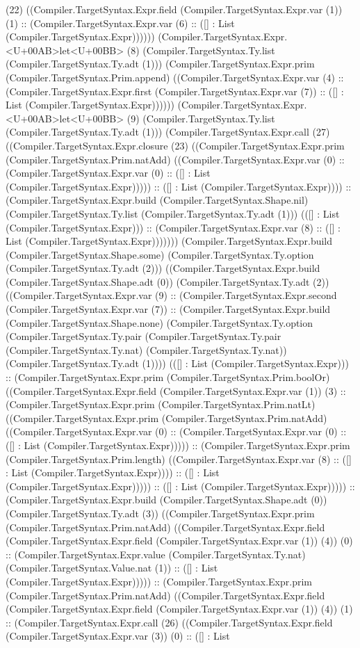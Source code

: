 \documentclass[11pt]{article}
\begin{document}
(22) ((Compiler.TargetSyntax.Expr.field (Compiler.TargetSyntax.Expr.var (1)) (1) :: (Compiler.TargetSyntax.Expr.var (6) :: ([] : List (Compiler.TargetSyntax.Expr)))))) (Compiler.TargetSyntax.Expr.<U+00AB>let<U+00BB> (8) (Compiler.TargetSyntax.Ty.list (Compiler.TargetSyntax.Ty.adt (1))) (Compiler.TargetSyntax.Expr.prim (Compiler.TargetSyntax.Prim.append) ((Compiler.TargetSyntax.Expr.var (4) :: (Compiler.TargetSyntax.Expr.first (Compiler.TargetSyntax.Expr.var (7)) :: ([] : List (Compiler.TargetSyntax.Expr)))))) (Compiler.TargetSyntax.Expr.<U+00AB>let<U+00BB> (9) (Compiler.TargetSyntax.Ty.list (Compiler.TargetSyntax.Ty.adt (1))) (Compiler.TargetSyntax.Expr.call (27) ((Compiler.TargetSyntax.Expr.closure (23) ((Compiler.TargetSyntax.Expr.prim (Compiler.TargetSyntax.Prim.natAdd) ((Compiler.TargetSyntax.Expr.var (0) :: (Compiler.TargetSyntax.Expr.var (0) :: ([] : List (Compiler.TargetSyntax.Expr))))) :: ([] : List (Compiler.TargetSyntax.Expr)))) :: (Compiler.TargetSyntax.Expr.build (Compiler.TargetSyntax.Shape.nil) (Compiler.TargetSyntax.Ty.list (Compiler.TargetSyntax.Ty.adt (1))) (([] : List (Compiler.TargetSyntax.Expr))) :: (Compiler.TargetSyntax.Expr.var (8) :: ([] : List (Compiler.TargetSyntax.Expr))))))) (Compiler.TargetSyntax.Expr.build (Compiler.TargetSyntax.Shape.some) (Compiler.TargetSyntax.Ty.option (Compiler.TargetSyntax.Ty.adt (2))) ((Compiler.TargetSyntax.Expr.build (Compiler.TargetSyntax.Shape.adt (0)) (Compiler.TargetSyntax.Ty.adt (2)) ((Compiler.TargetSyntax.Expr.var (9) :: (Compiler.TargetSyntax.Expr.second (Compiler.TargetSyntax.Expr.var (7)) :: (Compiler.TargetSyntax.Expr.build (Compiler.TargetSyntax.Shape.none) (Compiler.TargetSyntax.Ty.option (Compiler.TargetSyntax.Ty.pair (Compiler.TargetSyntax.Ty.pair (Compiler.TargetSyntax.Ty.nat) (Compiler.TargetSyntax.Ty.nat)) (Compiler.TargetSyntax.Ty.adt (1)))) (([] : List (Compiler.TargetSyntax.Expr))) :: (Compiler.TargetSyntax.Expr.prim (Compiler.TargetSyntax.Prim.boolOr) ((Compiler.TargetSyntax.Expr.field (Compiler.TargetSyntax.Expr.var (1)) (3) :: (Compiler.TargetSyntax.Expr.prim (Compiler.TargetSyntax.Prim.natLt) ((Compiler.TargetSyntax.Expr.prim (Compiler.TargetSyntax.Prim.natAdd) ((Compiler.TargetSyntax.Expr.var (0) :: (Compiler.TargetSyntax.Expr.var (0) :: ([] : List (Compiler.TargetSyntax.Expr))))) :: (Compiler.TargetSyntax.Expr.prim (Compiler.TargetSyntax.Prim.length) ((Compiler.TargetSyntax.Expr.var (8) :: ([] : List (Compiler.TargetSyntax.Expr)))) :: ([] : List (Compiler.TargetSyntax.Expr))))) :: ([] : List (Compiler.TargetSyntax.Expr))))) :: (Compiler.TargetSyntax.Expr.build (Compiler.TargetSyntax.Shape.adt (0)) (Compiler.TargetSyntax.Ty.adt (3)) ((Compiler.TargetSyntax.Expr.prim (Compiler.TargetSyntax.Prim.natAdd) ((Compiler.TargetSyntax.Expr.field (Compiler.TargetSyntax.Expr.field (Compiler.TargetSyntax.Expr.var (1)) (4)) (0) :: (Compiler.TargetSyntax.Expr.value (Compiler.TargetSyntax.Ty.nat) (Compiler.TargetSyntax.Value.nat (1)) :: ([] : List (Compiler.TargetSyntax.Expr))))) :: (Compiler.TargetSyntax.Expr.prim (Compiler.TargetSyntax.Prim.natAdd) ((Compiler.TargetSyntax.Expr.field (Compiler.TargetSyntax.Expr.field (Compiler.TargetSyntax.Expr.var (1)) (4)) (1) :: (Compiler.TargetSyntax.Expr.call (26) ((Compiler.TargetSyntax.Expr.field (Compiler.TargetSyntax.Expr.var (3)) (0) :: ([] : List 
\end{document}
